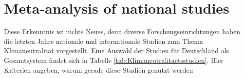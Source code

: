 \chapter{Meta-analysis of national studies}

Diese Erkenntnis ist nichts Neues, denn diverse Forschungseinrichtungen haben die letzten Jahre nationale und internationale Studien zum Thema Klimaneutralität vorgestellt. Eine Auswahl der Studien für Deutschland als Gesamtsystem findet sich in Tabelle \ref{tab:Klimaneutralitaetsstudien}.  
Hier Kriterien angeben, warum gerade diese Studien genutzt werden 
